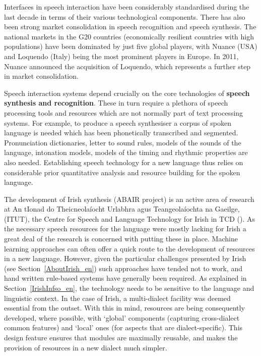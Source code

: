 \begin{multicols}{2}
Interfaces in speech interaction have been considerably standardised during the last decade in terms of their various technological components. There has also been strong market consolidation in speech recognition and speech synthesis. The national markets in the G20 countries (economically resilient countries with high populations) have been dominated by just five global players, with Nuance (USA) and Loquendo (Italy) being the most prominent players in Europe. In 2011, Nuance announced the acquisition of Loquendo, which represents a further step in market consolidation.


Speech interaction systems depend crucially on the core technologies of \textbf{speech synthesis and recognition}. These in turn require a plethora of speech processing tools and resources which are not normally part of text processing systems. For example, to produce a speech synthesiser a corpus of spoken language is needed which has been phonetically transcribed and segmented. Pronunciation dictionaries, letter to sound rules, models of the sounds of the language, intonation models, models of the timing and rhythmic properties are also needed. Establishing speech technology for a new language thus relies on considerable prior quantitative analysis and resource building for the spoken language. 

The development of Irish synthesis (ABAIR project) is an active area of research at An tIonad do Theicneolaíocht Urlabhra agus Teangeolaíochta na Gaeilge, (ITUT), the Centre for Speech and Language Technology for Irish in TCD (\cite{pittsburgh}).  As the necessary speech resources for the language were mostly lacking for Irish a great deal of the research is concerned with putting these in place. Machine learning approaches can often offer a quick route to the development of resources in a new language. However, given the particular challenges presented by Irish (see Section~\ref{AboutIrish_en}) such approaches have tended not to work, and hand written rule-based systems have generally been required. As explained in Section~\ref{IrishInfso_en}, the technology needs to be sensitive to the language and linguistic context. In the case of Irish, a multi-dialect facility was deemed essential from the outset. With this in mind, resources are being consequently developed, where possible, with `global’ components (capturing cross-dialect common features) and `local' ones (for aspects that are dialect-specific). This design feature ensures that modules are maximally reusable, and makes the provision of resources in a new dialect much simpler.


\end{multicols}
